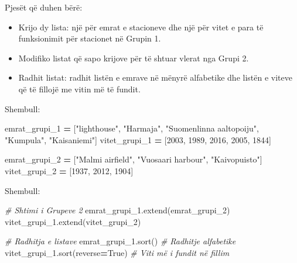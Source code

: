 \documentclass[
  ignorenonframetext,
]{beamer}
\newenvironment{Shaded}{\begin{snugshade}}{\end{snugshade}}
\newcommand{\CommentTok}[1]{\textcolor[rgb]{0.56,0.35,0.01}{\textit{#1}}}
\newcommand{\DecValTok}[1]{\textcolor[rgb]{0.00,0.00,0.81}{#1}}
\newcommand{\NormalTok}[1]{#1}
\newcommand{\OperatorTok}[1]{\textcolor[rgb]{0.81,0.36,0.00}{\textbf{#1}}}
\newcommand{\StringTok}[1]{\textcolor[rgb]{0.31,0.60,0.02}{#1}}
\newcommand{\VariableTok}[1]{\textcolor[rgb]{0.00,0.00,0.00}{#1}}
\begin{document}
\begin{frame}{Pjesët që duhen bërë:}
\protect\hypertarget{pjesuxebt-quxeb-duhen-buxebruxeb-1}{}
\begin{itemize}
\item
  Krijo dy lista: një për emrat e stacioneve dhe një për vitet e para të
  funksionimit për stacionet në Grupin 1.
\item
  Modifiko listat që sapo krijove për të shtuar vlerat nga Grupi 2.
\item
  Radhit listat: radhit listën e emrave në mënyrë alfabetike dhe listën
  e viteve që të fillojë me vitin më të fundit.
\end{itemize}
\end{frame}

\begin{frame}[fragile]{Shembull:}
\protect\hypertarget{shembull-2}{}
\begin{Shaded}
\begin{Highlighting}[]
\NormalTok{emrat\_grupi\_1 }\OperatorTok{=}\NormalTok{ [}\StringTok{"lighthouse"}\NormalTok{, }\StringTok{"Harmaja"}\NormalTok{, }\StringTok{"Suomenlinna aaltopoiju"}\NormalTok{, }\StringTok{"Kumpula"}\NormalTok{, }\StringTok{"Kaisaniemi"}\NormalTok{]}
\NormalTok{vitet\_grupi\_1 }\OperatorTok{=}\NormalTok{ [}\DecValTok{2003}\NormalTok{, }\DecValTok{1989}\NormalTok{, }\DecValTok{2016}\NormalTok{, }\DecValTok{2005}\NormalTok{, }\DecValTok{1844}\NormalTok{]}

\NormalTok{emrat\_grupi\_2 }\OperatorTok{=}\NormalTok{ [}\StringTok{"Malmi airfield"}\NormalTok{, }\StringTok{"Vuosaari harbour"}\NormalTok{, }\StringTok{"Kaivopuisto"}\NormalTok{]}
\NormalTok{vitet\_grupi\_2 }\OperatorTok{=}\NormalTok{ [}\DecValTok{1937}\NormalTok{, }\DecValTok{2012}\NormalTok{, }\DecValTok{1904}\NormalTok{]}
\end{Highlighting}
\end{Shaded}
\end{frame}

\begin{frame}[fragile]{Shembull:}
\protect\hypertarget{shembull-3}{}
\begin{Shaded}
\begin{Highlighting}[]
\CommentTok{\# Shtimi i Grupeve 2}
\NormalTok{emrat\_grupi\_1.extend(emrat\_grupi\_2)}
\NormalTok{vitet\_grupi\_1.extend(vitet\_grupi\_2)}

\CommentTok{\# Radhitja e listave}
\NormalTok{emrat\_grupi\_1.sort()  }\CommentTok{\# Radhitje alfabetike}
\NormalTok{vitet\_grupi\_1.sort(reverse}\OperatorTok{=}\VariableTok{True}\NormalTok{)  }\CommentTok{\# Viti më i fundit në fillim}
\end{Highlighting}
\end{Shaded}
\end{frame}
\end{document}
